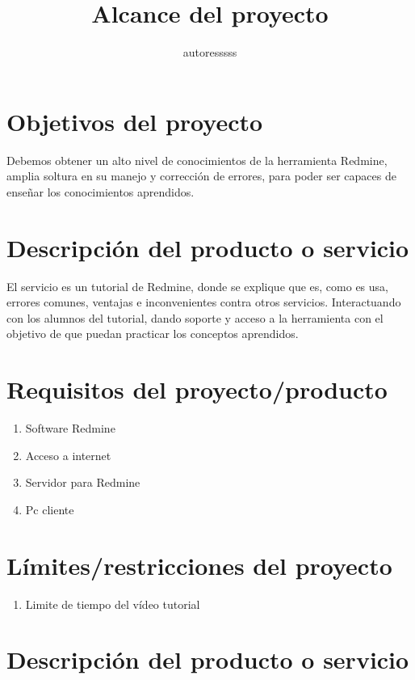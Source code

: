 \documentclass[a4paper,10pt]{article}
\title{Alcance del proyecto}
\author{autoresssss}
\begin{document}
\maketitle

\tableofcontents

\newpage



\section{Objetivos del proyecto}

Debemos obtener un alto nivel de conocimientos de la herramienta Redmine, amplia soltura en su manejo y corrección de errores, para poder ser capaces de enseñar los conocimientos aprendidos.

\section{Descripción del producto o servicio}

El servicio es un tutorial de Redmine, donde se explique que es, como es usa, errores comunes, ventajas e inconvenientes contra otros servicios. Interactuando con los alumnos del tutorial, dando soporte y acceso a la herramienta con el objetivo de que puedan practicar los conceptos aprendidos.

\section{Requisitos del proyecto/producto}

\begin{enumerate}
	\item Software Redmine
	\item Acceso a internet
	\item Servidor para Redmine
	\item Pc cliente
\end{enumerate}

\section{Límites/restricciones del proyecto}

\begin{enumerate}
	\item Limite de tiempo del vídeo tutorial
\end{enumerate}

\section{Descripción del producto o servicio}
\end{document}
